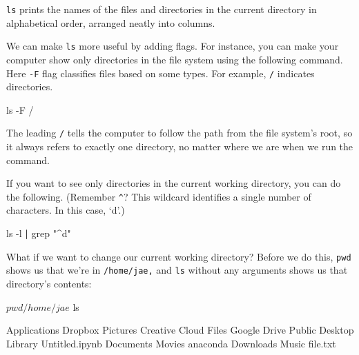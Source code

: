 \documentclass[
]{book}
\newenvironment{Shaded}{\begin{snugshade}}{\end{snugshade}}
\newcommand{\BuiltInTok}[1]{#1}
\newcommand{\ExtensionTok}[1]{#1}
\newcommand{\FunctionTok}[1]{\textcolor[rgb]{0.00,0.00,0.00}{#1}}
\newcommand{\KeywordTok}[1]{\textcolor[rgb]{0.13,0.29,0.53}{\textbf{#1}}}
\newcommand{\NormalTok}[1]{#1}
\newcommand{\StringTok}[1]{\textcolor[rgb]{0.31,0.60,0.02}{#1}}
\begin{document}
\texttt{ls} prints the names of the files and directories in the current directory in alphabetical order, arranged neatly into columns.

We can make \texttt{ls} more useful by adding flags. For instance, you can make your computer show only directories in the file system using the following command. Here \texttt{-F} flag classifies files based on some types. For example, \texttt{/} indicates directories.

\begin{Shaded}
\begin{Highlighting}[]
\FunctionTok{ls}\NormalTok{ {-}F /}
\end{Highlighting}
\end{Shaded}

The leading \texttt{/} tells the computer to follow the path from the file system's root, so it always refers to exactly one directory, no matter where we are when we run the command.

If you want to see only directories in the current working directory, you can do the following. (Remember \texttt{\^{}}? This wildcard identifies a single number of characters. In this case, `d'.)

\begin{Shaded}
\begin{Highlighting}[]
\FunctionTok{ls}\NormalTok{ {-}l }\KeywordTok{|} \FunctionTok{grep} \StringTok{"\^{}d"}
\end{Highlighting}
\end{Shaded}

What if we want to change our current working directory? Before we do this, \texttt{pwd} shows us that we're in \texttt{/home/jae,} and \texttt{ls} without any arguments shows us that directory's contents:

\begin{Shaded}
\begin{Highlighting}[]
\NormalTok{$ }\BuiltInTok{pwd}

\ExtensionTok{/home/jae}

\NormalTok{$ }\FunctionTok{ls}

\ExtensionTok{Applications}\NormalTok{        Dropbox         Pictures}
\ExtensionTok{Creative}\NormalTok{ Cloud Files    Google Drive        Public}
\ExtensionTok{Desktop}\NormalTok{         Library         Untitled.ipynb}
\ExtensionTok{Documents}\NormalTok{       Movies          anaconda}
\ExtensionTok{Downloads}\NormalTok{       Music           file.txt}
\end{Highlighting}
\end{Shaded}
\end{document}
